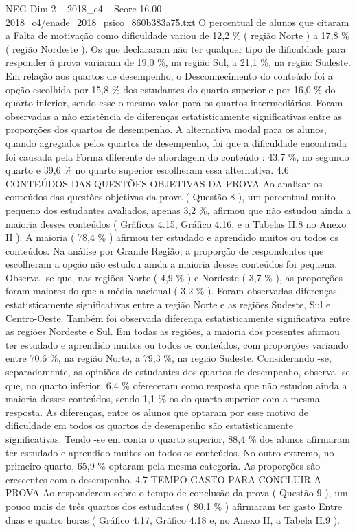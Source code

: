 \begin{textsample}{NEG Dim 2 – 2018\_c4 – Score 16.00 – 2018\_c4/enade\_2018\_psico\_860b383a75.txt}
O percentual de alunos que citaram a Falta de motivação como dificuldade variou de 12,2 \% ( região Norte ) a 17,8 \% ( região Nordeste ).
Os que declararam não ter qualquer tipo de dificuldade para responder à prova variaram de 19,0 \%, na região Sul, a 21,1 \%, na região Sudeste.
Em relação aos quartos de desempenho, o Desconhecimento do conteúdo foi a opção escolhida por 15,8 \% dos estudantes do quarto superior e por 16,0 \% do quarto inferior, sendo esse o mesmo valor para os quartos intermediários.
Foram observadas a não existência de diferenças estatisticamente significativas entre as proporções dos quartos de desempenho.
A alternativa modal para os alunos, quando agregados pelos quartos de desempenho, foi que a dificuldade encontrada foi causada pela Forma diferente de abordagem do conteúdo : 43,7 \%, no segundo quarto e 39,6 \% no quarto superior escolheram essa alternativa. 4.6 CONTEÚDOS DAS QUESTÕES OBJETIVAS DA PROVA Ao analisar os conteúdos das questões objetivas da prova ( Questão 8 ), um percentual muito pequeno dos estudantes avaliados, apenas 3,2 \%, afirmou que não estudou ainda a maioria desses conteúdos ( Gráficos 4.15, Gráfico 4.16, e a Tabelas II.8 no Anexo II ).
A maioria ( 78,4 \% ) afirmou ter estudado e aprendido muitos ou todos os conteúdos.
Na análise por Grande Região, a proporção de respondentes que escolheram a opção não estudou ainda a maioria desses conteúdos foi pequena.
Observa -se que, nas regiões Norte ( 4,9 \% ) e Nordeste ( 3,7 \% ), as proporções foram maiores do que a média nacional ( 3,2 \% ).
Foram observadas diferenças estatisticamente significativas entre a região Norte e as regiões Sudeste, Sul e Centro-Oeste.
Também foi observada diferença estatisticamente significativa entre as regiões Nordeste e Sul.
Em todas as regiões, a maioria dos presentes afirmou ter estudado e aprendido muitos ou todos os conteúdos, com proporções variando entre 70,6 \%, na região Norte, a 79,3 \%, na região Sudeste.
Considerando -se, separadamente, as opiniões de estudantes dos quartos de desempenho, observa -se que, no quarto inferior, 6,4 \% ofereceram como resposta que não estudou ainda a maioria desses conteúdos, sendo 1,1 \% os do quarto superior com a mesma resposta.
As diferenças, entre os alunos que optaram por esse motivo de dificuldade em todos os quartos de desempenho são estatisticamente significativas.
Tendo -se em conta o quarto superior, 88,4 \% dos alunos afirmaram ter estudado e aprendido muitos ou todos os conteúdos.
No outro extremo, no primeiro quarto, 65,9 \% optaram pela mesma categoria.
As proporções são crescentes com o desempenho. 4.7 TEMPO GASTO PARA CONCLUIR A PROVA Ao responderem sobre o tempo de conclusão da prova ( Questão 9 ), um pouco mais de três quartos dos estudantes ( 80,1 \% ) afirmaram ter gasto Entre duas e quatro horas ( Gráfico 4.17, Gráfico 4.18 e, no Anexo II, a Tabela II.9 ).

\end{textsample}
